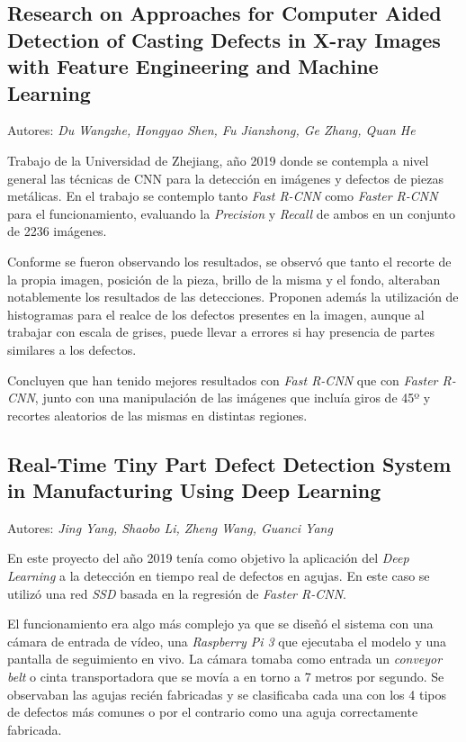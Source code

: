 
\subsection{Research on Approaches for Computer Aided Detection of Casting Defects in X-ray Images with Feature Engineering and Machine Learning}

Autores: \emph{Du Wangzhe, Hongyao Shen, Fu Jianzhong, Ge Zhang, Quan He}

Trabajo de la Universidad de Zhejiang, año 2019 donde se contempla a nivel general las técnicas de CNN para la detección en imágenes y defectos de piezas metálicas. En el trabajo se contemplo tanto \emph{Fast R-CNN} como \emph{Faster R-CNN} para el funcionamiento, evaluando la \emph{Precision} y \emph{Recall} de ambos en un conjunto de 2236 imágenes.

Conforme se fueron observando los resultados, se observó que tanto el recorte de la propia imagen, posición de la pieza, brillo de la misma y el fondo, alteraban notablemente los resultados de las detecciones. Proponen además la utilización de histogramas para el realce de los defectos presentes en la imagen, aunque al trabajar con escala de grises, puede llevar a errores si hay presencia de partes similares a los defectos.

Concluyen que han tenido mejores resultados con \emph{Fast R-CNN} que con \emph{Faster R-CNN}, junto con una manipulación de las imágenes que incluía giros de 45º y recortes aleatorios de las mismas en distintas regiones.
\cite{articulos:approaches}

\clearpage

\subsection{Real-Time Tiny Part Defect Detection System in Manufacturing Using Deep Learning}

Autores: \emph{Jing Yang, Shaobo Li, Zheng Wang, Guanci Yang}

En este proyecto\cite{articulos:tiny-parts} del año 2019 tenía como objetivo la aplicación del \emph{Deep Learning} a la detección en tiempo real de defectos en agujas. En este caso se utilizó una red \emph{SSD} \cite{Liu_2016} basada en la regresión de \emph{Faster R-CNN}. 

El funcionamiento era algo más complejo ya que se diseñó el sistema con una cámara de entrada de vídeo, una \emph{Raspberry Pi 3} que ejecutaba el modelo y una pantalla de seguimiento en vivo. La cámara tomaba como entrada un \emph{conveyor belt} o cinta transportadora que se movía a en torno a 7 metros por segundo. Se observaban las agujas recién fabricadas y se clasificaba cada una con los 4 tipos de defectos más comunes o por el contrario como una aguja correctamente fabricada.

